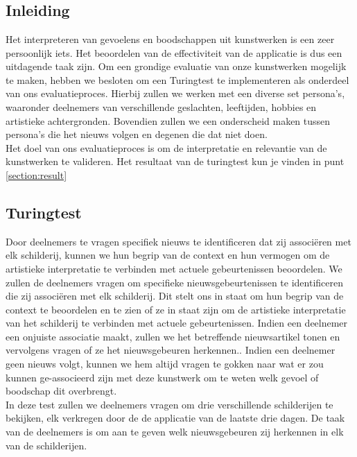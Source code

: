 \chapter{}%
\label{ch:evaluatieproces}
\section{Inleiding}
Het interpreteren van gevoelens en boodschappen uit kunstwerken is een zeer persoonlijk iets. Het beoordelen van de effectiviteit van de applicatie is dus een uitdagende taak zijn. Om een grondige evaluatie van onze kunstwerken mogelijk te maken, hebben we besloten om een Turingtest te implementeren als onderdeel van ons evaluatieproces. Hierbij zullen we werken met een diverse set persona's, waaronder deelnemers van verschillende geslachten, leeftijden, hobbies en artistieke achtergronden. Bovendien zullen we een onderscheid maken tussen persona's die het nieuws volgen en degenen die dat niet doen. \\

Het doel van ons evaluatieproces is om de interpretatie en relevantie van de kunstwerken te valideren. Het resultaat van de turingtest kun je vinden in punt \ref{section:result}
\section{Turingtest}
 Door deelnemers te vragen specifiek nieuws te identificeren dat zij associëren met elk schilderij, kunnen we hun begrip van de context en hun vermogen om de artistieke interpretatie te verbinden met actuele gebeurtenissen beoordelen. We zullen de deelnemers vragen om specifieke nieuwsgebeurtenissen te identificeren die zij associëren met elk schilderij. Dit stelt ons in staat om hun begrip van de context te beoordelen en te zien of ze in staat zijn om de artistieke interpretatie van het schilderij te verbinden met actuele gebeurtenissen. Indien een deelnemer een onjuiste associatie maakt, zullen we het betreffende nieuwsartikel tonen en vervolgens vragen of ze het nieuwsgebeuren herkennen.. Indien een deelnemer geen nieuws volgt, kunnen we hem altijd vragen te gokken naar wat er zou kunnen ge-associeerd zijn met deze kunstwerk om te weten welk gevoel of boodschap dit overbrengt. \\
 
 In deze test zullen we deelnemers vragen om drie verschillende schilderijen te bekijken, elk verkregen door de de applicatie van de laatste drie dagen. De taak van de deelnemers is om aan te geven welk nieuwsgebeuren zij herkennen in elk van de schilderijen.
  
